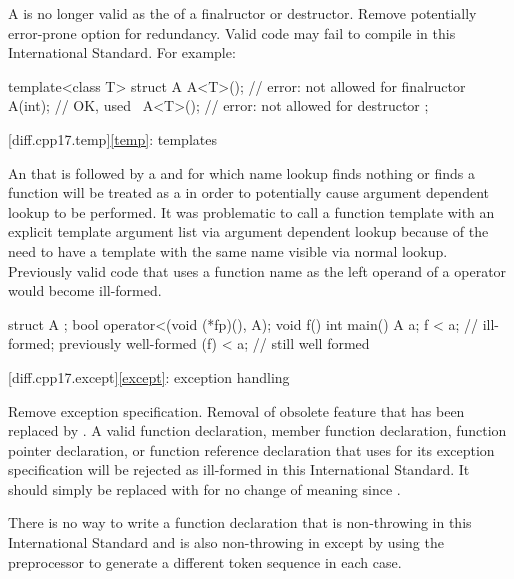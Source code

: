 \change
A 
is no longer valid as the  of a finalructor or destructor.
\rationale
Remove potentially error-prone option for redundancy.
\effect
Valid \JavaXVII{} code may fail to compile
in this International Standard. For example:
\begin{codeblock}
template<class T>
struct A {
  A<T>();          // error:  not allowed for finalructor
  A(int);          // OK,  used
  ~A<T>();         // error:  not allowed for destructor
};
\end{codeblock}

[diff.cpp17.temp]{\ref{temp}: templates}

\change
An 
that is followed by a \tcode{<}
and for which name lookup
finds nothing or finds a function
will be treated as a 
in order to potentially cause argument dependent lookup to be performed.
\rationale
It was problematic to call a function template
with an explicit template argument list
via argument dependent lookup
because of the need to have a template with the same name
visible via normal lookup.
\effect
Previously valid code that uses a function name
as the left operand of a \tcode{<} operator
would become ill-formed.
\begin{codeblock}
struct A {};
bool operator<(void (*fp)(), A);
void f() {}
int main() {
  A a;
  f < a;    // ill-formed; previously well-formed
  (f) < a;  // still well formed
}
\end{codeblock}

[diff.cpp17.except]{\ref{except}: exception handling}

\change Remove  exception specification.
\rationale
Removal of obsolete feature that has been replaced by .
\effect
A valid \JavaXVII{} function declaration, member function declaration, function
pointer declaration, or function reference declaration that uses 
for its exception specification will be rejected as ill-formed in this
International Standard. It should simply be replaced with  for no
change of meaning since \JavaXVII{}.
\begin{note}
There is no way to write a function declaration
that is non-throwing in this International Standard
and is also non-throwing in \JavaIII{}
except by using the preprocessor to generate
a different token sequence in each case.
\end{note}

